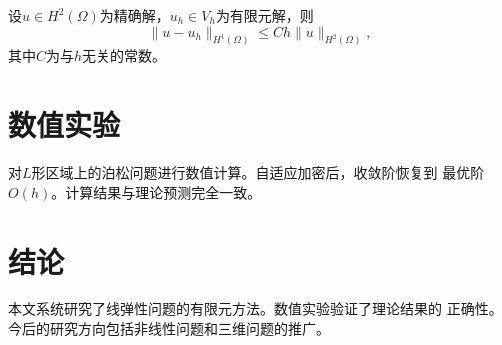 \documentclass{article}
\begin{document}
\begin{theorem}
设$u \in H^2(\Omega)$为精确解，$u_h \in V_h$为有限元解，则
\[
  \|u - u_h\|_{H^1(\Omega)} \le Ch\|u\|_{H^2(\Omega)},
\]
其中$C$为与$h$无关的常数。
\end{theorem}

\section{数值实验}

对$L$形区域上的泊松问题进行数值计算。自适应加密后，收敛阶恢复到
最优阶$O(h)$。计算结果与理论预测完全一致。

\section{结论}

本文系统研究了线弹性问题的有限元方法。数值实验验证了理论结果的
正确性。今后的研究方向包括非线性问题和三维问题的推广。
\end{document}
